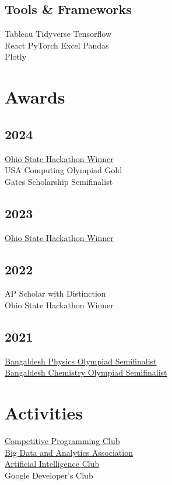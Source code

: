 \documentclass[]{farhan-resume-openfont}
\begin{document}
\begin{minipage}[t]{0.25\textwidth}
    \subsection{Tools \& Frameworks}
    Tableau \textbullet{} Tidyverse \textbullet{} Tensorflow \\ React \textbullet{}
    PyTorch \textbullet{} Excel \textbullet{} Pandas\\ Plotly

    \sectionsep


    \section{Awards}
    \subsection{2024}
    \href{https://hack.osu.edu/hs/fall-2023/}{Ohio State Hackathon Winner} \\
    USA Computing Olympiad Gold \\
    Gates Scholarship Semifinalist
    \subsection{2023}
    \href{https://hack.osu.edu/hs/fall-2023/}{Ohio State Hackathon Winner} \\

    \subsection{2022}
    {AP Scholar with Distinction} \\
    {Ohio State Hackathon Winner} \\
    \subsection{2021}
    \href{https://www.aapt.org/physicsteam/2024/index.cfm}{Bangaldesh Physics Olympiad Semifinalist} \\
    \href{https://www.acs.org/education/students/highschool/olympiad.html}{Bangaldesh Chemistry Olympiad Semifinalist} \\

    \section{Activities}
    \href{https://cpcosu.github.io/}{Competitive Programming Club} \\
    \href{https://bdaaosu.org/}{Big Data and Analytics Association} \\
    \href{https://www.osuaiclub.com/}{Artificial Intelligence Club} \\
    Google Developer's Club


\end{minipage}
\end{document}
